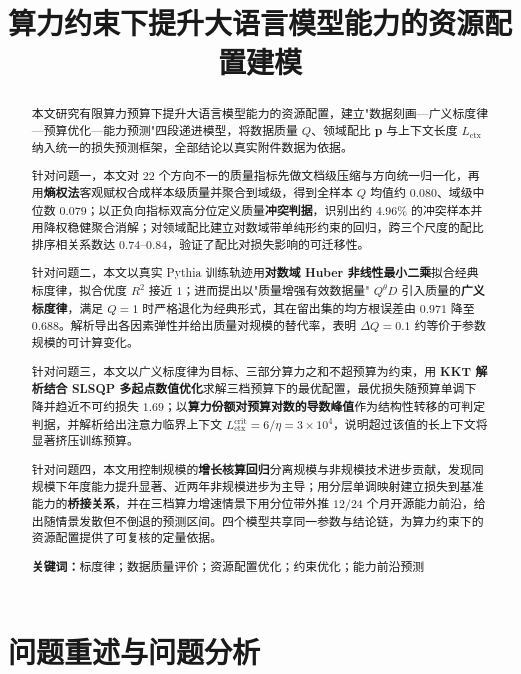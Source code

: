 \documentclass[12pt,a4paper]{ctexart}
\title{\bfseries 算力约束下提升大语言模型能力的资源配置建模}
\author{}
\date{}
\newcommand{\Dt}{D}
\newcommand{\Lctx}{L_{\mathrm{ctx}}}
\begin{document}
\maketitle

\begin{abstract}
\noindent
本文研究有限算力预算下提升大语言模型能力的资源配置，建立"数据刻画—广义标度律—预算优化—能力预测"四段递进模型，将数据质量 $Q$、领域配比 $\bm p$ 与上下文长度 $\Lctx$ 纳入统一的损失预测框架，全部结论以真实附件数据为依据。

针对问题一，本文对 $22$ 个方向不一的质量指标先做文档级压缩与方向统一归一化，再用\textbf{熵权法}客观赋权合成样本级质量并聚合到域级，得到全样本 $Q$ 均值约 $0.080$、域级中位数 $0.079$；以正负向指标双高分位定义质量\textbf{冲突判据}，识别出约 $4.96\%$ 的冲突样本并用降权稳健聚合消解；对领域配比建立对数域带单纯形约束的回归，跨三个尺度的配比排序相关系数达 $0.74$--$0.84$，验证了配比对损失影响的可迁移性。

针对问题二，本文以真实 Pythia 训练轨迹用\textbf{对数域 Huber 非线性最小二乘}拟合经典标度律，拟合优度 $R^2$ 接近 $1$；进而提出以"质量增强有效数据量" $Q^{\theta}\Dt$ 引入质量的\textbf{广义标度律}，满足 $Q=1$ 时严格退化为经典形式，其在留出集的均方根误差由 $0.971$ 降至 $0.688$。解析导出各因素弹性并给出质量对规模的替代率，表明 $\Delta Q=0.1$ 约等价于参数规模的可计算变化。

针对问题三，本文以广义标度律为目标、三部分算力之和不超预算为约束，用 \textbf{KKT 解析结合 SLSQP 多起点数值优化}求解三档预算下的最优配置，最优损失随预算单调下降并趋近不可约损失 $1.69$；以\textbf{算力份额对预算对数的导数峰值}作为结构性转移的可判定判据，并解析给出注意力临界上下文 $\Lctx^{\mathrm{crit}}=6/\eta=3\times10^{4}$，说明超过该值的长上下文将显著挤压训练预算。

针对问题四，本文用控制规模的\textbf{增长核算回归}分离规模与非规模技术进步贡献，发现同规模下年度能力提升显著、近两年非规模进步为主导；用分层单调映射建立损失到基准能力的\textbf{桥接关系}，并在三档算力增速情景下用分位带外推 $12/24$ 个月开源能力前沿，给出随情景发散但不倒退的预测区间。四个模型共享同一参数与结论链，为算力约束下的资源配置提供了可复核的定量依据。

\vspace{0.6em}

\noindent\textbf{关键词：}\quad 标度律；数据质量评价；资源配置优化；约束优化；能力前沿预测
\end{abstract}

\label{mh:body-start}

\section{问题重述与问题分析}
\end{document}
